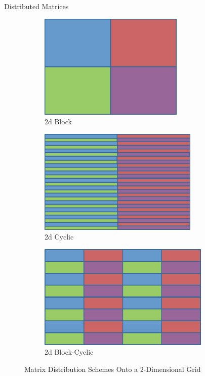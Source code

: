 \begin{frame}
\begin{block}{Distributed Matrices}
\begin{figure}[ht]
        \centering
        \begin{subfigure}[b]{0.3\textwidth}
                \centering
                
\includegraphics[height=5cm,width=\textwidth]{../common/pics/dmat_block2d}
                \caption{2d Block}
        \end{subfigure}%
        \hspace{.1cm}
        \begin{subfigure}[b]{0.3\textwidth}
                \centering
                
\includegraphics[height=5cm,width=\textwidth]{../common/pics/dmat_cyclic2d}
                \caption{2d Cyclic}
        \end{subfigure}
        \hspace{.01cm}
        \begin{subfigure}[b]{0.3\textwidth}
                \centering
                
\includegraphics[height=5cm,width=\textwidth]{../common/pics/dmat_blockcyclic2d}
                \caption{2d Block-Cyclic}
        \end{subfigure}
        \caption{Matrix Distribution Schemes Onto a 2-Dimensional 
Grid}\label{fig:dmat2d}
\end{figure}
\end{block}
\end{frame}



